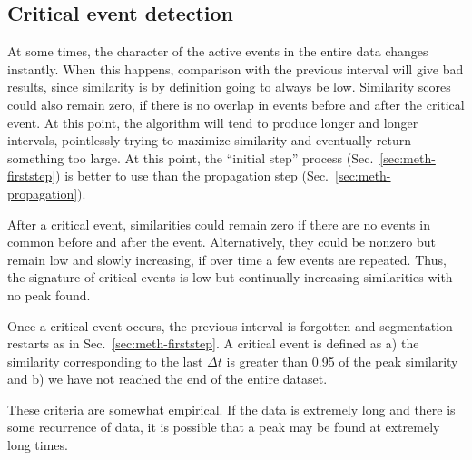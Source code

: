 \documentclass[draft]{article}
\begin{document}
\subsection{Critical event detection}
\label{sec:meth-critical}
At some times, the character of the active events in the entire data
changes instantly.  When
this happens, comparison with the previous interval will give bad
results, since similarity is by definition going to always be low.
Similarity scores could also remain zero, if there is no overlap in
events before and after the critical event.  At this point, the
algorithm will tend to produce longer and longer intervals,
pointlessly trying to maximize similarity and eventually return
something too large.   At
this point, the ``initial step'' process
(Sec.~\ref{sec:meth-firststep}) is better to use than the propagation
step (Sec.~\ref{sec:meth-propagation}).

After a critical event, similarities could remain zero if there are no
events in common before and after the event.  Alternatively, they
could be nonzero but remain low and slowly increasing, if over time a
few events are repeated.  Thus, the signature of critical events is
low but continually increasing similarities with no peak found.

Once a critical event occurs, the previous interval is forgotten and
segmentation restarts as in Sec.~\ref{sec:meth-firststep}.  A critical
event is defined as a) the similarity corresponding to the last
$\Delta t$ is greater than 0.95 of the peak similarity and b) we have
not reached the end of the entire dataset.

These criteria are somewhat empirical.  If the data is extremely long
and there is some recurrence of data, it is possible that a peak may
be found at extremely long times.
\end{document}
